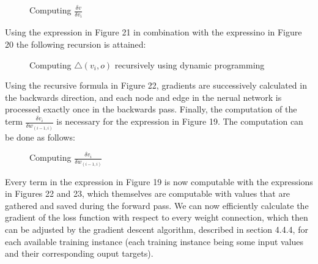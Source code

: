 \documentclass[titlepage]{article}
\begin{document}
\vskip 0.2cm

\begin{figure}[h]
    \centerline{}
    \vskip 0.2cm
    \caption{Computing $\frac{\delta v}{\delta v_{i}}$}
\end{figure}

\vskip 0.3cm

\noindent
Using the expression in Figure 21 in combination with the expressino in Figure 20 the following recursion is attained:

\vskip 0.3cm

\begin{figure}[h]
    \centerline{
    }
    \vskip 0.3cm
    \caption{Computing $\triangle (v_{i}, o)$ recursively using dynamic programming}
\end{figure}

\vskip 0.2cm

\noindent
Using the recursive formula in Figure 22, gradients are successively calculated in the backwards direction, and each node and edge in the nerual network is processed exactly once in the backwards pass. Finally, the computation of the term $\frac{\delta v_{i}}{\delta w_{(i-1, i)}}$ is necessary for the expression in Figure 19. The computation can be done as follows:

\vskip 0.3cm

\begin{figure}[h]
    \centerline{}
    \vskip 0.3cm
    \caption{Computing $\frac{\delta v_{i}}{\delta w_{(i-1, i)}}$}
\end{figure}

\vskip 0.2cm

\noindent
Every term in the expression in Figure 19 is now computable with the expressions in Figures 22 and 23, which themselves are computable with values that are gathered and saved during the forward pass. We can now efficiently calculate the gradient of the loss function with respect to every weight connection, which then can be adjusted by the gradient descent algorithm, described in section 4.4.4, for each available training instance (each training instance being some input values and their corresponding ouput targets).
\end{document}
